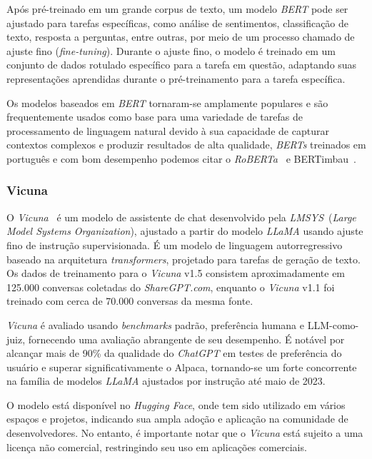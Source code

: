 Após pré-treinado em um grande corpus de texto, um modelo \textit{BERT} pode ser ajustado para tarefas específicas, como análise de sentimentos, classificação de texto, resposta a perguntas, entre outras, por meio de um processo chamado de ajuste fino (\textit{fine-tuning}). Durante o ajuste fino, o modelo é treinado em um conjunto de dados rotulado específico para a tarefa em questão, adaptando suas representações aprendidas durante o pré-treinamento para a tarefa específica.

Os modelos baseados em \textit{BERT} tornaram-se amplamente populares e são frequentemente usados como base para uma variedade de tarefas de processamento de linguagem natural devido à sua capacidade de capturar contextos complexos e produzir resultados de alta qualidade, \textit{BERTs} treinados em português e com bom desempenho podemos citar o \textit{RoBERTa}~\cite{liu2019roberta} e BERTimbau~\cite{souza2020bertimbau}.

\subsubsection{Vicuna}
\label{cap:fund_teorica:sec:modelos:subsec:vicuna}

O \textit{Vicuna}~\cite{vicuna2023} é um modelo de assistente de chat desenvolvido pela \textit{LMSYS}~(\textit{Large Model Systems Organization}), ajustado a partir do modelo \textit{LLaMA} usando ajuste fino de instrução supervisionada. É um modelo de linguagem autorregressivo baseado na arquitetura \textit{transformers}, projetado para tarefas de geração de texto. Os dados de treinamento para o \textit{Vicuna} v1.5 consistem aproximadamente em 125.000 conversas coletadas do \textit{ShareGPT.com}, enquanto o \textit{Vicuna} v1.1 foi treinado com cerca de 70.000 conversas da mesma fonte.

\textit{Vicuna} é avaliado usando \textit{benchmarks} padrão, preferência humana e LLM-como-juiz, fornecendo uma avaliação abrangente de seu desempenho. É notável por alcançar mais de 90\% da qualidade do \textit{ChatGPT} em testes de preferência do usuário e superar significativamente o Alpaca, tornando-se um forte concorrente na família de modelos \textit{LLaMA} ajustados por instrução até maio de 2023.

O modelo está disponível no \textit{Hugging Face}, onde tem sido utilizado em vários espaços e projetos, indicando sua ampla adoção e aplicação na comunidade de desenvolvedores. No entanto, é importante notar que o \textit{Vicuna} está sujeito a uma licença não comercial, restringindo seu uso em aplicações comerciais.

